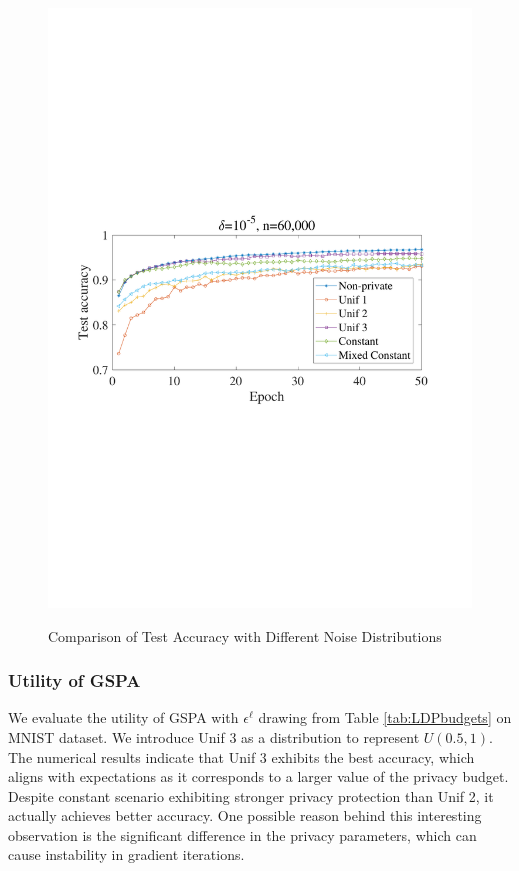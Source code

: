 \documentclass[letterpaper]{article} %
\begin{document}
\begin{figure}
  \centering
  \includegraphics[scale=0.4]{picture/TestAccuracySGD.pdf}\\
  \caption{Comparison of Test Accuracy with Different Noise Distributions}\label{Fig:MnistSGDTrain}
\end{figure}
\subsubsection*{Utility of GSPA}
We evaluate the utility of GSPA with $\epsilon^\ell$ drawing from Table \ref{tab:LDPbudgets} on MNIST dataset. We introduce Unif 3 as a distribution to represent $U(0.5,1)$.
The numerical results indicate that Unif 3 exhibits the best accuracy, which aligns with expectations as it corresponds to a larger value of the privacy budget. Despite constant scenario exhibiting stronger privacy protection than Unif 2, it actually achieves better accuracy. One possible reason behind this interesting observation is the significant difference in the privacy parameters, which can cause instability in gradient iterations.
\end{document}
